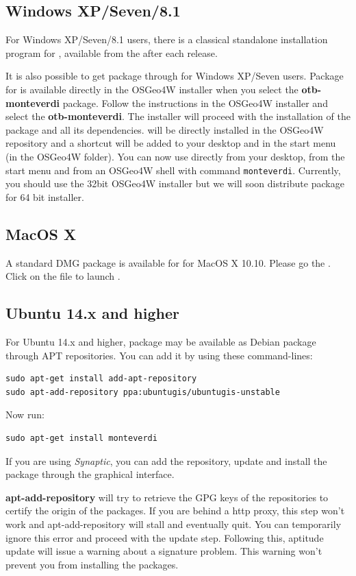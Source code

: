 \subsection{Windows XP/Seven/8.1}
For Windows XP/Seven/8.1 users, there is a classical standalone installation program for \mont, available from the \download after each release. 

It is also possible to get \mont package through \osgeow for Windows XP/Seven users. 
Package for \mont is available directly in the OSGeo4W installer when you select the \textbf{otb-monteverdi} package. 
Follow the instructions in the OSGeo4W installer and select the \textbf{otb-monteverdi}. 
The installer will proceed with the installation of the package and all its dependencies. 
\mont will be directly installed in the OSGeo4W repository and a shortcut will be added to your desktop and in the start menu (in the OSGeo4W folder). 
You can now use directly \mont from your desktop, from the start menu and from an OSGeo4W shell with command \texttt{monteverdi}. 
Currently, you should use the 32bit OSGeo4W installer but we will soon distribute \mont package for 64 bit installer. 

\subsection{MacOS X}
A standard DMG package is available for \mont for MacOS X 10.10. Please go the \download.
Click on the file to launch \mont. 

\subsection{Ubuntu 14.x and higher}
For Ubuntu 14.x and higher, \mont package may be available as Debian package through APT repositories.
You can add it by using these command-lines:
\begin{verbatim}
sudo apt-get install add-apt-repository
sudo apt-add-repository ppa:ubuntugis/ubuntugis-unstable
\end{verbatim}

Now run:
\begin{verbatim}
sudo apt-get install monteverdi
\end{verbatim}

If you are using \emph{Synaptic}, you can add the repository, update and install the package through the
graphical interface.

\textbf{apt-add-repository} will try to retrieve the GPG keys of the
repositories to certify the origin of the packages. If you are behind a http
proxy, this step won't work and apt-add-repository will stall and eventually
quit. You can temporarily ignore this error and proceed with the update
step. Following this, aptitude update will issue a warning about a signature
problem. This warning won't prevent you from installing the packages.



